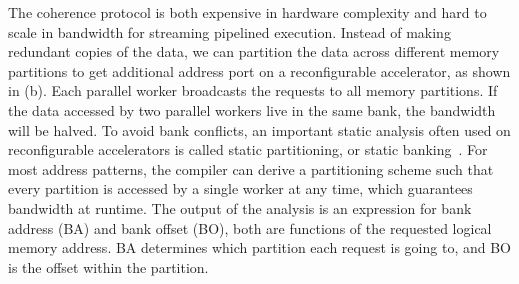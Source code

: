 The coherence protocol is both expensive in hardware complexity and hard to scale in bandwidth for
streaming pipelined execution.
Instead of making redundant copies of the data, we can partition the data across different memory
partitions to get additional address port on a reconfigurable accelerator, as shown in
 (b).
Each parallel worker broadcasts the requests to all memory partitions.
If the data accessed by two parallel workers live in the same bank, the bandwidth will be halved.
To avoid bank conflicts, an important static analysis often used on reconfigurable accelerators is called static partitioning, or static banking~\cite{poly_cong}.
For most address patterns, the compiler can derive a partitioning scheme such that every partition is accessed by a
single worker at any time, which guarantees bandwidth at runtime.
The output of the analysis is an expression for bank address (BA) and bank offset (BO), both are
functions of the requested logical memory address.
BA determines which partition each request is going to, and BO is the offset within the
partition.

